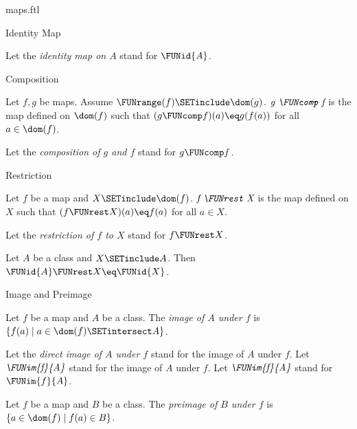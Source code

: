 \documentclass{naproche-library}
\begin{document}
\begin{smodule}[title=Maps]{maps.ftl}
\begin{sfragment}{Identity Map}
\begin{definition}[forthel,id=FOUNDATIONS_06_1920902360989696]
    Let the \emph{identity map on $A$} stand for $\FUNid{A}$.
  \end{definition}
\end{sfragment}

\begin{sfragment}{Composition}
  \begin{definition}[forthel,id=FOUNDATIONS_06_7605717729017856]
    Let $f, g$ be maps.
    Assume $\FUNrange(f) \SETinclude \dom(g)$.
    $\emph{g \FUNcomp f}$ is the map defined on $\dom(f)$ such that $(g \FUNcomp f)(a) \eq g(f(a))$ for all $a \in \dom(f)$.

    Let the \emph{composition of $g$ and $f$} stand for $g \FUNcomp f$.
  \end{definition}
\end{sfragment}

\begin{sfragment}{Restriction}
  \begin{definition}[forthel,id=FOUNDATIONS_06_7095412741636096]
    Let $f$ be a map and $X \SETinclude \dom(f)$.
    $\emph{f \FUNrest X}$ is the map defined on $X$ such that $(f \FUNrest X)(a) \eq f(a)$ for all $a \in X$.

    Let the \emph{restriction of $f$ to $X$} stand for $f \FUNrest X$.
  \end{definition}

  \begin{proposition}[forthel,id=FOUNDATIONS_06_2170189258948608]
    Let $A$ be a class and $X \SETinclude A$.
    Then $\FUNid{A} \FUNrest X \eq \FUNid{X}$.
  \end{proposition}
\end{sfragment}

\begin{sfragment}{Image and Preimage}
  \begin{definition}[forthel,id=FOUNDATIONS_06_3038237683613696]
    Let $f$ be a map and $A$ be a class.
    The \emph{image of $A$ under $f$} is $\{ f(a) \mid a \in \dom(f) \SETintersect A \}$.

    Let the \emph{direct image of $A$ under $f$} stand for the image of $A$ under $f$.
    Let $\emph{\FUNim{f}{A}}$ stand for the image of $A$ under $f$.
    Let $\emph{\FUNim{f}{A}}$ stand for $\FUNim{f}{A}$.
  \end{definition}

  \begin{definition}[forthel,id=FOUNDATIONS_06_4563167805964288]
    Let $f$ be a map and $B$ be a class.
    The \emph{preimage of $B$ under $f$} is $\{ a \in \dom(f) \mid f(a) \in B \}$.


\end{definition}
\end{sfragment}
\end{smodule}
\end{document}
